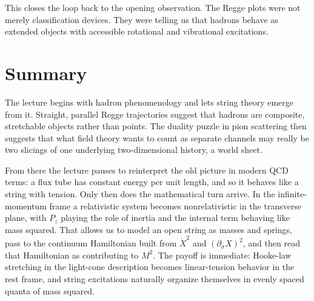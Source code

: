 This closes the loop back to the opening observation. The Regge plots were not merely classification devices. They were telling us that hadrons behave as extended objects with accessible rotational and vibrational excitations.

\section{Summary}

The lecture begins with hadron phenomenology and lets string theory emerge from it. Straight, parallel Regge trajectories suggest that hadrons are composite, stretchable objects rather than points. The duality puzzle in pion scattering then suggests that what field theory wants to count as separate channels may really be two slicings of one underlying two-dimensional history, a world sheet.

From there the lecture pauses to reinterpret the old picture in modern QCD terms: a flux tube has constant energy per unit length, and so it behaves like a string with tension. Only then does the mathematical turn arrive. In the infinite-momentum frame a relativistic system becomes nonrelativistic in the transverse plane, with \(P_z\) playing the role of inertia and the internal term behaving like mass squared. That allows us to model an open string as masses and springs, pass to the continuum Hamiltonian built from \(\dot X^2\) and \((\partial_\sigma X)^2\), and then read that Hamiltonian as contributing to \(M^2\). The payoff is immediate: Hooke-law stretching in the light-cone description becomes linear-tension behavior in the rest frame, and string excitations naturally organize themselves in evenly spaced quanta of mass squared.